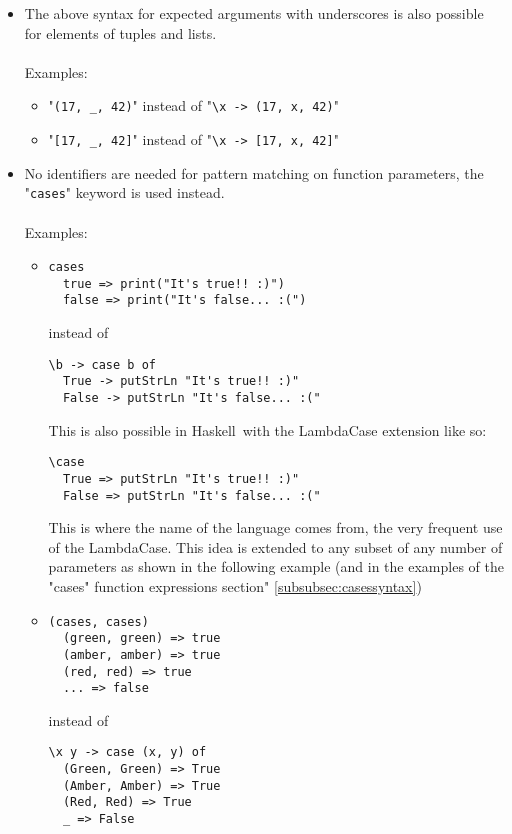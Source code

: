 \documentclass[diploma]{softlab-thesis}
\def\H{Haskell}
\begin{document}
\begin{itemize}
\begin{itemize}
\item
"\verb|_^2 + _^2|" instead of "\verb|\x y -> x^2 + y^2|"

\item
etc

\end{itemize}

\item
The above syntax for expected arguments with underscores is also possible
for elements of tuples and lists.
\\\\
Examples:\\
\begin{itemize}

\item
"\verb|(17, _, 42)|" instead of "\verb|\x -> (17, x, 42)|"

\item
"\verb|[17, _, 42]|" instead of "\verb|\x -> [17, x, 42]|"

\end{itemize}

\newpage
\item
No identifiers are needed for pattern matching on function parameters,
the "\texttt{cases}" keyword is used instead.
\\\\
Examples:\\

\begin{itemize}

\item
\begin{verbatim}
cases
  true => print("It's true!! :)")
  false => print("It's false... :(")
\end{verbatim}
instead of
\begin{verbatim}
\b -> case b of
  True -> putStrLn "It's true!! :)"
  False -> putStrLn "It's false... :("
\end{verbatim}
This is also possible in \H\ with the LambdaCase extension like so:
\begin{verbatim}
\case
  True => putStrLn "It's true!! :)"
  False => putStrLn "It's false... :("
\end{verbatim}
This is where the name of the language comes from, the very frequent use
of the LambdaCase. This idea is extended to any subset of any number of
parameters as shown in the following example (and in the examples of
the "cases" function expressions section" \ref{subsubsec:casessyntax})

\item
\begin{verbatim}
(cases, cases)
  (green, green) => true
  (amber, amber) => true
  (red, red) => true
  ... => false
\end{verbatim}
instead of
\begin{verbatim}
\x y -> case (x, y) of
  (Green, Green) => True
  (Amber, Amber) => True
  (Red, Red) => True
  _ => False
\end{verbatim}
\end{itemize}


\end{itemize}
\end{document}
